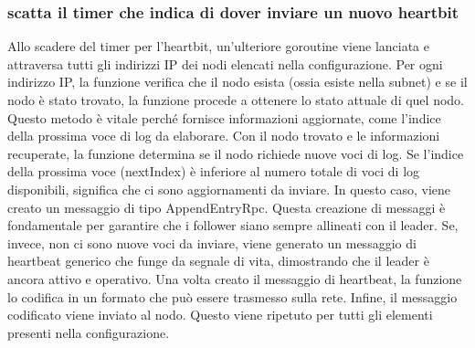 \subsubsection{scatta il timer che indica di dover inviare un nuovo heartbit}
Allo scadere del timer per l'heartbit, un'ulteriore goroutine viene lanciata e attraversa tutti gli indirizzi IP dei nodi elencati nella configurazione. Per ogni indirizzo IP, la funzione verifica che il nodo esista (ossia esiste 
nella subnet) e
se il nodo è stato trovato, la funzione procede a ottenere lo stato attuale di quel nodo. Questo metodo è vitale perché fornisce informazioni aggiornate, come l'indice della prossima voce di log da elaborare. 
Con il nodo trovato e le informazioni recuperate, la funzione determina se il nodo richiede nuove voci di log. Se l'indice della prossima voce (nextIndex) è inferiore al numero totale di voci di log disponibili, significa che ci
sono aggiornamenti da inviare. In questo caso, viene creato un messaggio di tipo AppendEntryRpc.
Questa creazione di messaggi è fondamentale per garantire che i follower siano sempre allineati con il leader. Se, invece, non ci sono nuove voci da inviare, viene generato un messaggio di heartbeat generico che funge da 
segnale di vita, dimostrando che il leader è ancora attivo e operativo.
Una volta creato il messaggio di heartbeat, la funzione lo codifica in un formato che può essere trasmesso sulla rete.
Infine, il messaggio codificato viene inviato al nodo. 
Questo viene ripetuto per tutti gli elementi presenti nella configurazione.



